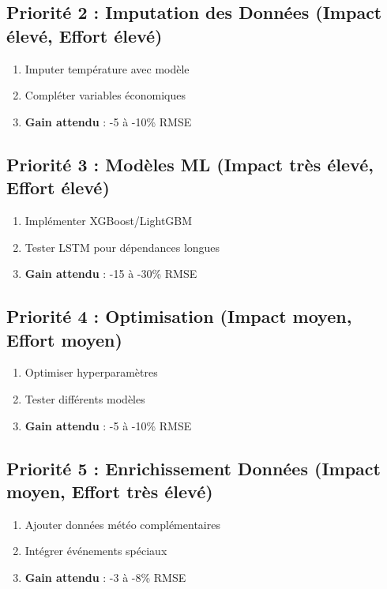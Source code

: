 \documentclass[12pt,a4paper]{article}
\begin{document}
\subsection{Priorité 2 : Imputation des Données (Impact élevé, Effort élevé)}

\begin{enumerate}
    \item Imputer température avec modèle
    \item Compléter variables économiques
    \item \textbf{Gain attendu} : -5 à -10\% RMSE
\end{enumerate}

\subsection{Priorité 3 : Modèles ML (Impact très élevé, Effort élevé)}

\begin{enumerate}
    \item Implémenter XGBoost/LightGBM
    \item Tester LSTM pour dépendances longues
    \item \textbf{Gain attendu} : -15 à -30\% RMSE
\end{enumerate}

\subsection{Priorité 4 : Optimisation (Impact moyen, Effort moyen)}

\begin{enumerate}
    \item Optimiser hyperparamètres
    \item Tester différents modèles
    \item \textbf{Gain attendu} : -5 à -10\% RMSE
\end{enumerate}

\subsection{Priorité 5 : Enrichissement Données (Impact moyen, Effort très élevé)}

\begin{enumerate}
    \item Ajouter données météo complémentaires
    \item Intégrer événements spéciaux
    \item \textbf{Gain attendu} : -3 à -8\% RMSE
\end{enumerate}
\end{document}
